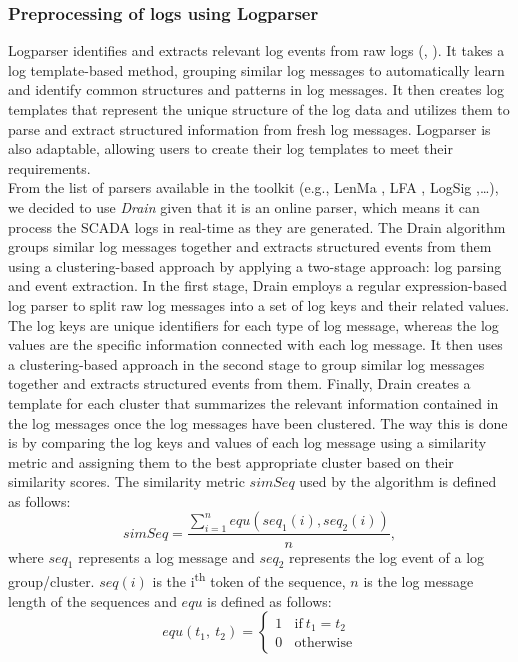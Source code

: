       \subsubsection{Preprocessing of logs using Logparser}
        Logparser identifies and extracts relevant log events from raw logs (\cite{Logparser_1}, \cite{Logparser_2}). 
        It takes a log template-based method, grouping similar log messages to automatically learn and identify common structures and patterns in log messages. 
        It then creates log templates that represent the unique structure of the log data and utilizes them to parse and extract structured information from fresh log messages.
        Logparser is also adaptable, allowing users to create their log templates to meet their requirements.\\
        From the list of parsers available in the toolkit (e.g., LenMa \cite{LenMa}, LFA \cite{LFA}, LogSig \cite{LogSig},\dots), 
        we decided to use \emph{Drain} \cite{Drain} given that it is an online parser, which means it can process the SCADA logs 
        in real-time as they are generated. The Drain algorithm groups similar log messages together and extracts structured events from them using a 
        clustering-based approach by applying a two-stage approach: log parsing and event extraction.
        In the first stage, Drain employs a regular expression-based log parser to split raw log messages into a set of log keys and their related values. 
        The log keys are unique identifiers for each type of log message, whereas the log values are the specific information connected with each log message.
        It then uses a clustering-based approach in the second stage to group similar log messages together and extracts structured events from them. 
        Finally, Drain creates a template for each cluster that summarizes the relevant information contained in the log messages once the log messages have been clustered.
        The way this is done is by comparing the log keys and values of each log message using a similarity metric and assigning them to the best appropriate cluster based on 
        their similarity scores. The similarity metric $simSeq$ used by the algorithm is defined as follows:
        \begin{equation*} 
          simSeq=\frac{\sum_{i=1}^{n}equ(seq_{1}(i), seq_{2}(i))}{n}, \tag{1} 
        \end{equation*}
        where $seq_1$ represents a log message and $seq_2$ represents the log event of a log group/cluster. 
        $seq(i)$ is the i\textsuperscript{th} token of the sequence, $n$ is the log message length of the sequences and $equ$ is defined as follows:
        \begin{equation*} 
          equ(t_{1},\ t_{2})=
            \begin{cases} 
              1\ \ \ \ \text{if}\ t_{1}=t_{2} \\ 
              0\ \ \ \ \text{otherwise} 
            \end{cases} \tag{2} 
        \end{equation*}
        

